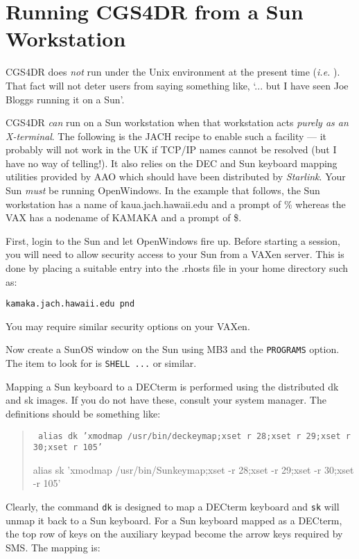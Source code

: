 \section{Running CGS4DR from a Sun Workstation}

CGS4DR does {\em not} run under the Unix environment at the present time
({\em i.e.} \stardocdate). That fact will not deter users from saying
something like, `... but I have seen Joe Bloggs running it on a Sun'.

CGS4DR {\em can} run on a Sun workstation when that workstation acts {\em
purely as an X-terminal}. The following is the JACH recipe to enable such a
facility --- it probably will not work in the UK if TCP/IP names cannot  be
resolved (but I have no way of telling!). It also relies on the DEC and  Sun
keyboard mapping utilities provided by AAO which should have been  distributed
by {\sl Starlink}. Your Sun {\em must} be running OpenWindows. In the  example
that follows, the Sun workstation has a name of kaua.jach.hawaii.edu and a
prompt of {\sf \%} whereas the VAX has a nodename of KAMAKA and a prompt of
{\sf \$}.

First, login to the Sun and let OpenWindows fire up.
Before starting a session, you will need to allow security access to
your Sun from a VAXen server. This is done by placing a suitable entry
into the .rhosts file in your home directory such as:

\begin{verbatim}
kamaka.jach.hawaii.edu pnd
\end{verbatim}

You may require similar security options on your VAXen.

Now create a SunOS window on the Sun using MB3 and the {\tt PROGRAMS} option.
The item to look for is {\tt SHELL ...} or similar.

Mapping a Sun keyboard to a DECterm is performed using the distributed
{\sf dk} and {\sf sk} images. If you do not have these, consult your
system manager. The definitions should be something like:

\begin{quote}
{\scriptsize \tt
  alias dk 'xmodmap /usr/bin/deckeymap;xset  r 28;xset  r 29;xset  r 30;xset  r 105'

  alias sk 'xmodmap /usr/bin/Sunkeymap;xset -r 28;xset -r 29;xset -r 30;xset -r 105'
}
\end{quote}

Clearly, the command {\tt dk} is designed to map a DECterm keyboard and
{\tt sk} will unmap it back to a Sun keyboard. For a Sun keyboard mapped as a
DECterm, the top row of keys on the auxiliary keypad become the arrow
keys required by SMS. The mapping is:

